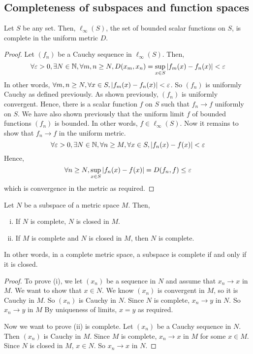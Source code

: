 \subsection{Completeness of subspaces and function spaces}
\begin{theorem}
	Let \( S \) be any set.
	Then, \( \ell_\infty(S) \), the set of bounded scalar functions on \( S \), is complete in the uniform metric \( D \).
\end{theorem}
\begin{proof}
	Let \( (f_n) \) be a Cauchy sequence in \( \ell_\infty(S) \).
	Then,
	\[
		\forall \varepsilon > 0, \exists N \in \mathbb N, \forall m,n \geq N, D(x_m, x_n) = \sup_{x \in S} \abs{f_m(x) - f_n(x)} < \varepsilon
	\]
	In other words, \( \forall m,n \geq N, \forall x \in S, \abs{f_m(x) - f_n(x)} < \varepsilon \).
	So \( (f_n) \) is uniformly Cauchy as defined previously.
	As shown previously, \( (f_n) \) is uniformly convergent.
	Hence, there is a scalar function \( f \) on \( S \) such that \( f_n \to f \) uniformly on \( S \).
	We have also shown previously that the uniform limit \( f \) of bounded functions \( (f_n) \) is bounded.
	In other words, \( f \in \ell_\infty(S) \).
	Now it remains to show that \( f_n \to f \) in the uniform metric.
	\[
		\forall \varepsilon > 0, \exists N \in \mathbb N, \forall n \geq M, \forall x \in S, \abs{f_n(x) - f(x)} < \varepsilon
	\]
	Hence,
	\[
		\forall n \geq N, \sup_{x \in S} \abs{f_n(x) - f(x)} = D(f_n,f) \leq \varepsilon
	\]
	which is convergence in the metric as required.
\end{proof}
\begin{proposition}
	Let \( N \) be a subspace of a metric space \( M \).
	Then,
	\begin{enumerate}[(i)]
		\item If \( N \) is complete, \( N \) is closed in \( M \).
		\item If \( M \) is complete and \( N \) is closed in \( M \), then \( N \) is complete.
	\end{enumerate}
	In other words, in a complete metric space, a subspace is complete if and only if it is closed.
\end{proposition}
\begin{proof}
	To prove (i), we let \( (x_n) \) be a sequence in \( N \) and assume that \( x_n \to x \) in \( M \).
	We want to show that \( x \in N \).
	We know \( (x_n) \) is convergent in \( M \), so it is Cauchy in \( M \).
	So \( (x_n) \) is Cauchy in \( N \).
	Since \( N \) is complete, \( x_n \to y \) in \( N \).
	So \( x_n \to y \) in \( M \)
	By uniqueness of limits, \( x = y \) as required.

	Now we want to prove (ii) is complete.
	Let \( (x_n) \) be a Cauchy sequence in \( N \).
	Then \( (x_n) \) is Cauchy in \( M \).
	Since \( M \) is complete, \( x_n \to x \) in \( M \) for some \( x \in M \).
	Since \( N \) is closed in \( M \), \( x \in N \).
	So \( x_n \to x \) in \( N \).
\end{proof}
